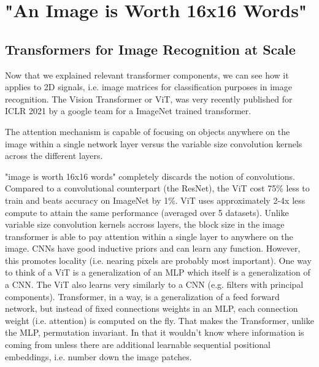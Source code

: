 \section{"An Image is Worth 16x16 Words"}

\subsection{Transformers for Image Recognition at Scale}

Now that we explained relevant transformer components, we can see how it applies 
to 2D signals, i.e. image matrices for classification purposes in image recognition.
The Vision Transformer or ViT, was very recently published for ICLR 2021 by a 
google team for a ImageNet trained transformer.

The attention mechanism is capable of focusing on objects anywhere on the image 
within a single network layer versus the variable size convolution kernels 
across the different layers.

"image is worth 16x16 words" completely discards the notion of convolutions. 
Compared to a convolutional counterpart (the ResNet), the ViT cost 75\% 
less to train and beats accuracy on ImageNet by 1\%. 
ViT uses approximately 2-4x less compute to attain the same performance 
(averaged over 5 datasets). Unlike variable size convolution kernels accross 
layers, the block size in the image transformer is able to pay attention within 
a single layer to anywhere on the image. 
CNNs have good inductive priors and can learn any function. 
However, this promotes locality (i.e. nearing pixels are probably most important).
One way to think of a ViT is a generalization of an MLP which itself is a 
generalization of a CNN. The ViT also learns very similarly to a CNN 
(e.g. filters with principal components).
Transformer, in a way, is a generalization of a feed forward network, but 
instead of fixed connections weights in an MLP, each connection weight (i.e. attention) 
is computed on the fly. That makes the Transformer, unlike the MLP, permutation invariant. 
In that it wouldn't know where information is coming from unless there are additional 
learnable sequential positional embeddings, i.e. number down the image patches.




